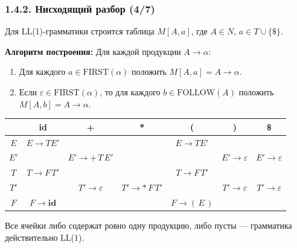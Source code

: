 \begin{frame}
\frametitle{1.4.2. Нисходящий разбор (4/7)}
Для LL(1)-грамматики строится таблица $M[A, a]$, где $A \in N$, $a \in T \cup \{\$\}$.

\textbf{Алгоритм построения:}
Для каждой продукции $A \to \alpha$:
\begin{enumerate}
    \item Для каждого $a \in \textrm{FIRST}(\alpha)$ положить $M[A, a] = A \to \alpha$.
    \item Если $\varepsilon \in \textrm{FIRST}(\alpha)$, то для каждого $b \in \textrm{FOLLOW}(A)$ положить $M[A, b] = A \to \alpha$.
\end{enumerate}

\begin{center}
\small
\begin{tabular}{|c|c|c|c|c|c|c|}
\hline
 & \textbf{id} & \textbf{+} & \textbf{*} & \textbf{(} & \textbf{)} & \textbf{\$} \\ \hline
$E$  & $E \to T E'$ &  &  & $E \to T E'$ &  &  \\ \hline
$E'$ &  & $E' \to +\,T\,E'$ &  &  & $E' \to \varepsilon$ & $E' \to \varepsilon$ \\ \hline
$T$  & $T \to F\,T'$ &  &  & $T \to F\,T'$ &  &  \\ \hline
$T'$ &  & $T' \to \varepsilon$ & $T' \to *\,F\,T'$ &  & $T' \to \varepsilon$ & $T' \to \varepsilon$ \\ \hline
$F$  & $F \to \mathbf{id}$ &  &  & $F \to (\,E\,)$ &  &  \\ \hline
\end{tabular}
\end{center}

\begin{remark}
Все ячейки либо содержат ровно одну продукцию, либо пусты — грамматика действительно LL(1).
\end{remark}

\end{frame}

